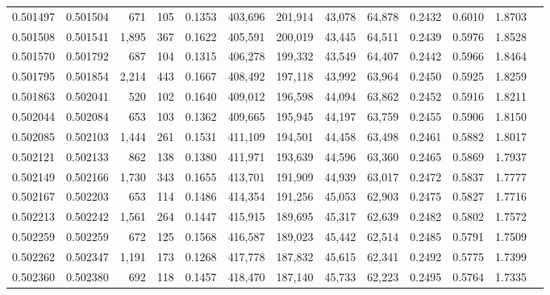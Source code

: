 \begin{tabular}{rrrrrrrrrrrrr}
0.501497 & 0.501504 &   671 &   105 &                                     0.1353 & 403,696 & 201,914 &  43,078 &  64,878 & 0.2432 & 0.6010 & 1.8703 \\
0.501508 & 0.501541 & 1,895 &   367 &                                     0.1622 & 405,591 & 200,019 &  43,445 &  64,511 & 0.2439 & 0.5976 & 1.8528 \\
0.501570 & 0.501792 &   687 &   104 &                                     0.1315 & 406,278 & 199,332 &  43,549 &  64,407 & 0.2442 & 0.5966 & 1.8464 \\
0.501795 & 0.501854 & 2,214 &   443 &                                     0.1667 & 408,492 & 197,118 &  43,992 &  63,964 & 0.2450 & 0.5925 & 1.8259 \\
0.501863 & 0.502041 &   520 &   102 &                                     0.1640 & 409,012 & 196,598 &  44,094 &  63,862 & 0.2452 & 0.5916 & 1.8211 \\
0.502044 & 0.502084 &   653 &   103 &                                     0.1362 & 409,665 & 195,945 &  44,197 &  63,759 & 0.2455 & 0.5906 & 1.8150 \\
0.502085 & 0.502103 & 1,444 &   261 &                                     0.1531 & 411,109 & 194,501 &  44,458 &  63,498 & 0.2461 & 0.5882 & 1.8017 \\
0.502121 & 0.502133 &   862 &   138 &                                     0.1380 & 411,971 & 193,639 &  44,596 &  63,360 & 0.2465 & 0.5869 & 1.7937 \\
0.502149 & 0.502166 & 1,730 &   343 &                                     0.1655 & 413,701 & 191,909 &  44,939 &  63,017 & 0.2472 & 0.5837 & 1.7777 \\
0.502167 & 0.502203 &   653 &   114 &                                     0.1486 & 414,354 & 191,256 &  45,053 &  62,903 & 0.2475 & 0.5827 & 1.7716 \\
0.502213 & 0.502242 & 1,561 &   264 &                                     0.1447 & 415,915 & 189,695 &  45,317 &  62,639 & 0.2482 & 0.5802 & 1.7572 \\
0.502259 & 0.502259 &   672 &   125 &                                     0.1568 & 416,587 & 189,023 &  45,442 &  62,514 & 0.2485 & 0.5791 & 1.7509 \\
0.502262 & 0.502347 & 1,191 &   173 &                                     0.1268 & 417,778 & 187,832 &  45,615 &  62,341 & 0.2492 & 0.5775 & 1.7399 \\
0.502360 & 0.502380 &   692 &   118 &                                     0.1457 & 418,470 & 187,140 &  45,733 &  62,223 & 0.2495 & 0.5764 & 1.7335 \\

\end{tabular}
